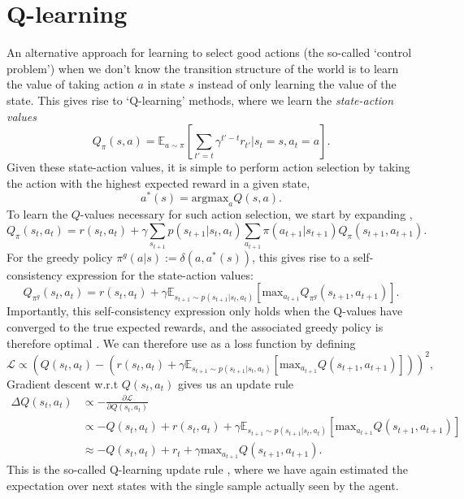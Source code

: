 \section{Q-learning}
\label{sec:q_learning}

An alternative approach for learning to select good actions (the so-called `control problem') when we don't know the transition structure of the world is to learn the value of taking action $a$ in state $s$ instead of only learning the value of the state.
This gives rise to `Q-learning' methods, where we learn the \emph{state-action values}
\begin{equation}
    \label{eq:Q-values}
    Q_\pi(s,a) =  \mathbb{E}_{a \sim \pi} \left [ \sum_{t'=t} \gamma^{t' - t} r_{t'} | s_{t} = s, a_{t} = a \right ].
\end{equation}
Given these state-action values, it is simple to perform action selection by taking the action with the highest expected reward in a given state,
\begin{equation}
    a^*(s) = \text{argmax}_{a} Q(s, a).
\end{equation}
To learn the $Q$-values necessary for such action selection, we start by expanding ,
\begin{equation}
    \label{eq:Q-expanded}
    Q_\pi(s_t,a_t) =  r(s_t, a_t) + \gamma \sum_{s_{t+1}} p(s_{t+1} | s_t, a_t) \sum_{a_{t+1}} \pi(a_{t+1} | s_{t+1}) Q_\pi(s_{t+1}, a_{t+1}).
\end{equation}
For the greedy policy $\pi^g(a|s) := \delta(a, a^*(s))$, this gives rise to a self-consistency expression for the state-action values:
\begin{equation}
    \label{eq:Q-optimal}
    Q_{\pi^g}(s_t,a_t) =  r(s_t, a_t) + \gamma \mathbb{E}_{s_{t+1} \sim p(s_{t+1} | s_t, a_t)} \left [ \text{max}_{a_{t+1}} Q_{\pi^g}(s_{t+1}, a_{t+1}) \right ].
\end{equation}
Importantly, this self-consistency expression only holds when the Q-values have converged to the true expected rewards, and the associated greedy policy is therefore optimal \citep{sutton2018reinforcement}.
We can therefore use  as a loss function by defining
\begin{equation}
    \mathcal{L} \propto \left (  Q(s_t,a_t) - (r(s_t, a_t) + \gamma \mathbb{E}_{s_{t+1} \sim p(s_{t+1} | s_t, a_t)} \left [ \text{max}_{a_{t+1}} Q(s_{t+1}, a_{t+1}) \right ] ) \right )^2,
\end{equation}
Gradient descent w.r.t $Q(s_t,a_t)$ gives us an update rule
\begin{align}
    \Delta  Q(s_t,a_t) & \propto - \frac{\partial \mathcal{L}}{\partial  Q(s_t,a_t)}\\
    &\propto - Q(s_t,a_t) + r(s_t, a_t) + \gamma \mathbb{E}_{s_{t+1} \sim p(s_{t+1} | s_t, a_t)} \left [ \text{max}_{a_{t+1}} Q(s_{t+1}, a_{t+1}) \right ] \\
    &\approx - Q(s_t,a_t) + r_t + \gamma \text{max}_{a_{t+1}} Q(s_{t+1}, a_{t+1}).
\end{align}
This is the so-called Q-learning update rule \citep{watkins1989learning}, where we have again estimated the expectation over next states with the single sample actually seen by the agent.

